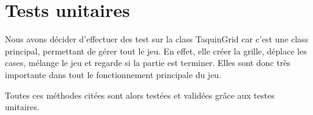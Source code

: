 	\section{Tests unitaires}
		Nous avons décider d'effectuer des test sur la class TaquinGrid car c'est une class principal, permettant de gérer tout le jeu. En effet, elle créer la grille, déplace les cases, mélange le jeu et regarde si la partie est terminer. Elles sont donc très importante dans tout le fonctionnement principale du jeu.

		Toutes ces méthodes citées sont alors testées et validées grâce aux testes unitaires.

